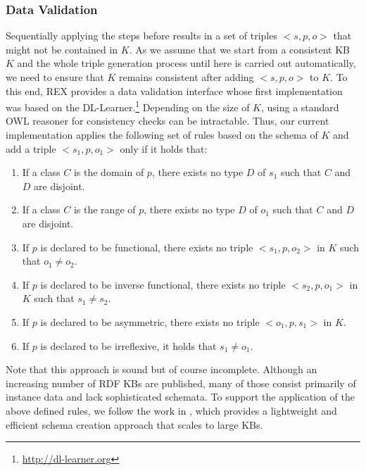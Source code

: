\subsubsection{Data Validation}\label{axioms}
Sequentially applying the steps before results in a set of triples $<s,p,o>$ that might not be contained in $K$. 
As we assume that we start from a consistent  \ac{KB} $K$ and the whole triple generation process until here is carried out automatically, we need to ensure that $K$ remains consistent after adding $<s,p,o>$ to $K$.
To this end, REX provides a data validation interface whose first implementation was based on the DL-Learner.\footnote{\url{http://dl-learner.org}}
Depending on the size of $K$, using a standard OWL reasoner for consistency checks can be intractable.
Thus, our current implementation applies the following set of rules based on the schema of $K$ and add a triple $<s_1,p,o_1>$ only if it holds that:
\begin{enumerate}
\item If a class $C$ is the domain of $p$, there exists no type $D$ of $s_1$ such that $C$ and $D$ are disjoint.
\item If a class $C$ is the range of $p$, there exists no type $D$ of $o_1$ such that $C$ and $D$ are disjoint.
\item If $p$ is declared to be functional, there exists no triple $<s_1,p,o_2>$ in $K$ such that $o_1 \neq o_2$.
\item If $p$ is declared to be inverse functional, there exists no triple $<s_2,p,o_1>$ in $K$ such that $s_1 \neq s_2$.
\item If $p$ is declared to be asymmetric, there exists no triple $<o_1,p,s_1>$ in $K$.
\item If $p$ is declared to be irreflexive, it holds that $s_1 \neq o_1$.
\end{enumerate}
Note that this approach is sound but of course incomplete.
Although an increasing number of \ac{RDF}  \ac{KB}s are published, many of those consist primarily of instance data and lack sophisticated schemata. 
To support the application of the above defined rules, we follow the work in \cite{Buehmann2012,pattern_enrichment}, which provides a lightweight and efficient schema creation approach that scales to large  \ac{KB}s. 


